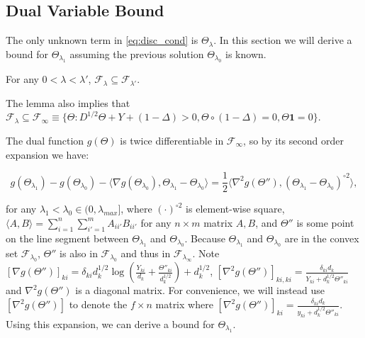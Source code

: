 \subsection{Dual Variable Bound}

The only unknown term in \eqref{eq:disc_cond} is $\Theta_{\lambda}$. In this section we will derive a bound for $\Theta_{\lambda_1}$ assuming the previous solution $\Theta_{\lambda_{0}}$ is known.

\begin{lemma}
    \label{lem:1}
    For any $0<\lambda<\lambda'$, $\mathcal{F}_{\lambda}\subseteq\mathcal{F}_{\lambda'}$.
\end{lemma}

The lemma also implies that $\mathcal{F}_{\lambda}\subseteq\mathcal{F}_{\infty}\equiv\{\Theta: D^{1/2}\Theta+Y+(1-\Delta)> 0,\Theta\circ(1-\Delta)=0, \Theta\mathbf{1}=0\}$.

The dual function $g(\Theta)$ is twice differentiable in $\mathcal{F}_{\infty}$, so by its second order expansion we have:

\begin{equation}
        \label{eq:expand}
        g(\Theta_{\lambda_1})-g(\Theta_{\lambda_{0}})-\langle\nabla g(\Theta_{\lambda_{0}}),\Theta_{\lambda_{1}}-\Theta_{\lambda_{0}}\rangle=\frac{1}{2}\langle\nabla^2 g(\Theta''),(\Theta_{\lambda_{1}}-\Theta_{\lambda_{0}})^{\circ 2}\rangle,%
\end{equation}

for any $\lambda_1<\lambda_{0}\in (0,\lambda_{max}]$, where $(\cdot)^{\circ2}$ is element-wise square, $\langle A,B\rangle=\sum_{i=1}^n\sum_{i'=1}^mA_{ii'}B_{ii'}$ for any $n\times m$ matrix $A,B$, and $\Theta''$ is some point on the line segment between $\Theta_{\lambda_{1}}$ and $\Theta_{\lambda_{0}}$. Because $\Theta_{\lambda_{1}}$ and $\Theta_{\lambda_{0}}$ are in the convex set $\mathcal{F}_{\lambda_{0}}$, $\Theta''$ is also in $\mathcal{F}_{\lambda_{0}}$ and thus in $\mathcal{F}_{\lambda_{\infty}}$. Note $[\nabla g(\Theta'')]_{ki}=\delta_{ki}d_k^{1/2}\log\left(\frac{Y_{ki}}{d_k}+\frac{\Theta''_{ki}}{d_k^{1/2}}\right)+d_k^{1/2}$, $[\nabla^2 g(\Theta'')]_{ki,ki}=\frac{\delta_{ki}d_k}{Y_{ki}+d_k^{1/2}\Theta''_{ki}}$ and $\nabla^2 g(\Theta'')$ is a diagonal matrix. For convenience, we will instead use $[\nabla^2 g(\Theta'')]$ to denote the $f\times n$ matrix where $[\nabla^2 g(\Theta'')]_{ki}=\frac{\delta_{ki}d_k}{y_{ki}+d_k^{1/2}\Theta''_{ki}}$. Using this expansion, we can derive a bound for $\Theta_{\lambda_1}$.



